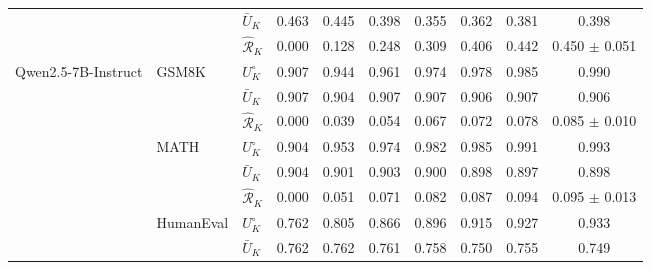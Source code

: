\begin{table}[t]
\begin{tabular}{lll *{7}{c}}
 &  & $\bar U_K$ & \cellcolor{colAEU!28}0.463 & \cellcolor{colAEU!27}0.445 & \cellcolor{colAEU!24}0.398 & \cellcolor{colAEU!21}0.355 & \cellcolor{colAEU!22}0.362 & \cellcolor{colAEU!23}0.381 & \cellcolor{colAEU!24}0.398 \\
 &  & $\hat{\mathcal R}_K$ & \cellcolor{colRVR!0}0.000 & \cellcolor{colRVR!8}0.128 & \cellcolor{colRVR!15}0.248 & \cellcolor{colRVR!19}0.309 & \cellcolor{colRVR!24}0.406 & \cellcolor{colRVR!27}0.442 & \cellcolor{colRVR!27}0.450 $\pm$ 0.051 \\
\midrule
\multirow{9}{*}{Qwen2.5-7B-Instruct} & \multirow{3}{*}{GSM8K} & $U^\circ_K$ & \cellcolor{colREU!54}0.907 & \cellcolor{colREU!57}0.944 & \cellcolor{colREU!58}0.961 & \cellcolor{colREU!58}0.974 & \cellcolor{colREU!59}0.978 & \cellcolor{colREU!59}0.985 & \cellcolor{colREU!59}0.990 \\
 &  & $\bar U_K$ & \cellcolor{colAEU!54}0.907 & \cellcolor{colAEU!54}0.904 & \cellcolor{colAEU!54}0.907 & \cellcolor{colAEU!54}0.907 & \cellcolor{colAEU!54}0.906 & \cellcolor{colAEU!54}0.907 & \cellcolor{colAEU!54}0.906 \\
 &  & $\hat{\mathcal R}_K$ & \cellcolor{colRVR!0}0.000 & \cellcolor{colRVR!2}0.039 & \cellcolor{colRVR!3}0.054 & \cellcolor{colRVR!4}0.067 & \cellcolor{colRVR!4}0.072 & \cellcolor{colRVR!5}0.078 & \cellcolor{colRVR!5}0.085 $\pm$ 0.010 \\
\cmidrule(l){2-10}
 & \multirow{3}{*}{MATH} & $U^\circ_K$ & \cellcolor{colREU!54}0.904 & \cellcolor{colREU!57}0.953 & \cellcolor{colREU!58}0.974 & \cellcolor{colREU!59}0.982 & \cellcolor{colREU!59}0.985 & \cellcolor{colREU!59}0.991 & \cellcolor{colREU!60}0.993 \\
 &  & $\bar U_K$ & \cellcolor{colAEU!54}0.904 & \cellcolor{colAEU!54}0.901 & \cellcolor{colAEU!54}0.903 & \cellcolor{colAEU!54}0.900 & \cellcolor{colAEU!54}0.898 & \cellcolor{colAEU!54}0.897 & \cellcolor{colAEU!54}0.898 \\
 &  & $\hat{\mathcal R}_K$ & \cellcolor{colRVR!0}0.000 & \cellcolor{colRVR!3}0.051 & \cellcolor{colRVR!4}0.071 & \cellcolor{colRVR!5}0.082 & \cellcolor{colRVR!5}0.087 & \cellcolor{colRVR!6}0.094 & \cellcolor{colRVR!6}0.095 $\pm$ 0.013 \\
\cmidrule(l){2-10}
 & \multirow{3}{*}{HumanEval} & $U^\circ_K$ & \cellcolor{colREU!46}0.762 & \cellcolor{colREU!48}0.805 & \cellcolor{colREU!52}0.866 & \cellcolor{colREU!54}0.896 & \cellcolor{colREU!55}0.915 & \cellcolor{colREU!56}0.927 & \cellcolor{colREU!56}0.933 \\
 &  & $\bar U_K$ & \cellcolor{colAEU!46}0.762 & \cellcolor{colAEU!46}0.762 & \cellcolor{colAEU!46}0.761 & \cellcolor{colAEU!46}0.758 & \cellcolor{colAEU!45}0.750 & \cellcolor{colAEU!45}0.755 & \cellcolor{colAEU!45}0.749 \\

\end{tabular}
\end{table}
